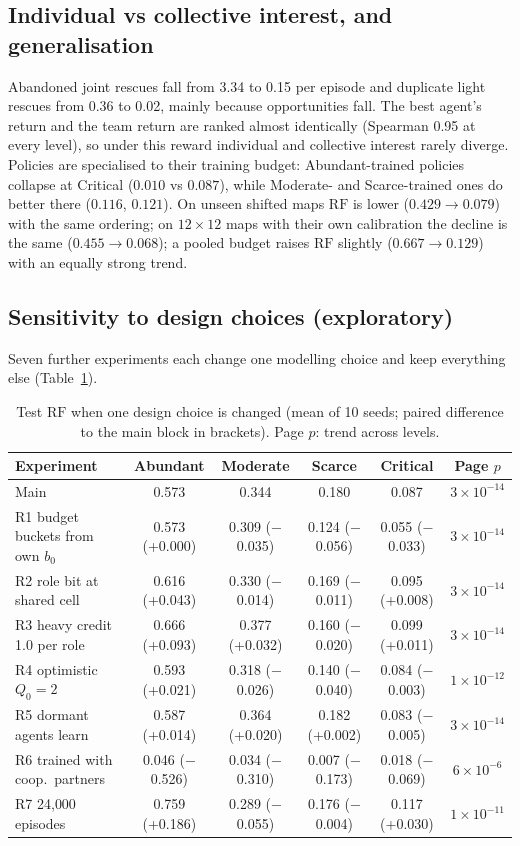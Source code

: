 \documentclass{article}
\newcommand{\RF}{\mathrm{RF}}
\begin{document}
\subsection{Individual vs collective interest, and generalisation}
Abandoned joint rescues fall from 3.34 to 0.15 per episode and duplicate light rescues from 0.36 to 0.02, mainly
because opportunities fall. The best agent's return and the team return are ranked almost identically (Spearman 0.95 at
every level), so under this reward individual and collective interest rarely diverge.
Policies are specialised to their training budget: Abundant-trained policies collapse at Critical ($0.010$ vs
$0.087$), while Moderate- and Scarce-trained ones do better there ($0.116$, $0.121$). On unseen shifted maps $\RF$ is
lower ($0.429\to0.079$) with the same ordering; on $12\times12$ maps with their own calibration the decline is the same
($0.455\to0.068$); a pooled budget raises $\RF$ slightly ($0.667\to0.129$) with an equally strong trend.

\subsection{Sensitivity to design choices (exploratory)}\label{sec:robust}
Seven further experiments each change one modelling choice and keep everything else (Table~\ref{tab:robust}).

\begin{table}[h]
\centering\small
\caption{Test $\RF$ when one design choice is changed (mean of 10 seeds; paired difference to the main block in
brackets). Page $p$: trend across levels.}
\label{tab:robust}
\begin{tabular}{@{}lccccc@{}}
\toprule
Experiment & Abundant & Moderate & Scarce & Critical & Page $p$ \\
\midrule
Main & 0.573 & 0.344 & 0.180 & 0.087 & $3\times10^{-14}$ \\
R1 budget buckets from own $b_0$ & 0.573 (+0.000) & 0.309 ($-$0.035) & 0.124 ($-$0.056) & 0.055 ($-$0.033) & $3\times10^{-14}$ \\
R2 role bit at shared cell & 0.616 (+0.043) & 0.330 ($-$0.014) & 0.169 ($-$0.011) & 0.095 (+0.008) & $3\times10^{-14}$ \\
R3 heavy credit 1.0 per role & 0.666 (+0.093) & 0.377 (+0.032) & 0.160 ($-$0.020) & 0.099 (+0.011) & $3\times10^{-14}$ \\
R4 optimistic $Q_0=2$ & 0.593 (+0.021) & 0.318 ($-$0.026) & 0.140 ($-$0.040) & 0.084 ($-$0.003) & $1\times10^{-12}$ \\
R5 dormant agents learn & 0.587 (+0.014) & 0.364 (+0.020) & 0.182 (+0.002) & 0.083 ($-$0.005) & $3\times10^{-14}$ \\
R6 trained with coop.\ partners & 0.046 ($-$0.526) & 0.034 ($-$0.310) & 0.007 ($-$0.173) & 0.018 ($-$0.069) & $6\times10^{-6}$ \\
R7 24{,}000 episodes & 0.759 (+0.186) & 0.289 ($-$0.055) & 0.176 ($-$0.004) & 0.117 (+0.030) & $1\times10^{-11}$ \\
\bottomrule
\end{tabular}
\end{table}
\end{document}

